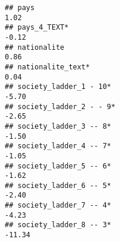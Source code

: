 \documentclass[
]{article}
\begin{document}
\begin{verbatim}
## pays                                                                                                                                                                                                                         1.02
## pays_4_TEXT*                                                                                                                                                                                                                -0.12
## nationalite                                                                                                                                                                                                                  0.86
## nationalite_text*                                                                                                                                                                                                            0.04
## society_ladder_1 - 10*                                                                                                                                                                                                      -5.70
## society_ladder_2 - - 9*                                                                                                                                                                                                     -2.65
## society_ladder_3 -- 8*                                                                                                                                                                                                      -1.50
## society_ladder_4 -- 7*                                                                                                                                                                                                      -1.05
## society_ladder_5 -- 6*                                                                                                                                                                                                      -1.62
## society_ladder_6 -- 5*                                                                                                                                                                                                      -2.40
## society_ladder_7 -- 4*                                                                                                                                                                                                      -4.23
## society_ladder_8 -- 3*                                                                                                                                                                                                     -11.34

\end{verbatim}
\end{document}
